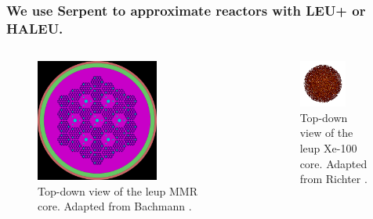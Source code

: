 \documentclass[9pt]{beamer}
\begin{document}
  \begin{frame}
    \frametitle{We use Serpent to approximate reactors with LEU+ or HALEU.}
    \begin{columns}
      \column[t]{5cm}
      \begin{figure}
        \centering
        \includegraphics[width=0.65\textwidth]{images/haleu_mmr_2blocks.inp_geom1.png}
        \caption{Top-down view of the \gls{leup} MMR core. Adapted from Bachmann \cite{bachmann_mmr_like_2023}.}
        \label{fig:td_mmr}
      \end{figure}

      \column[t]{5cm}
      \begin{figure}[htbp!]
        \begin{center}
          \includegraphics[width=0.65\textwidth]{images/htgr-mr-burn-200.inp_mesh1_bstep6.png}
        \end{center}
        \caption{Top-down view of the \gls{leup} Xe-100 core. Adapted from Richter \cite{richter_xe100_like}.}
        \label{fig:td_xe100}
      \end{figure}
    \end{columns}
  \end{frame}
\end{document}

